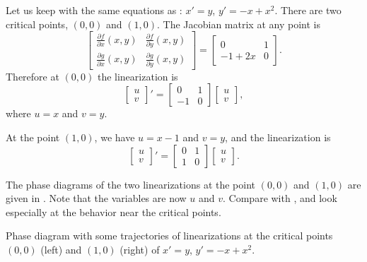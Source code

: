 \begin{example} \label{example:nlin-1b-examplelin}
Let us keep with the same equations as :
$x' = y$, $y' = -x+x^2$.  There are two critical points, $(0,0)$
and $(1,0)$.  The Jacobian matrix at any point is
\begin{equation*}
\begin{bmatrix}
\frac{\partial f}{\partial x}(x,y) &
\frac{\partial f}{\partial y}(x,y) \\
\frac{\partial g}{\partial x}(x,y) &
\frac{\partial g}{\partial y}(x,y)
\end{bmatrix} =
\begin{bmatrix}
0 & 1 \\
-1+2x & 0
\end{bmatrix}.
\end{equation*}
Therefore at $(0,0)$ the linearization is
\begin{equation*}
\begin{bmatrix} u \\ v \end{bmatrix} ' =
\begin{bmatrix}
0 & 1 \\
-1 & 0
\end{bmatrix}
\begin{bmatrix} u \\ v \end{bmatrix} ,
\end{equation*}
where $u=x$ and $v=y$.

At the point $(1,0)$, we have $u=x-1$ and $v=y$, and the linearization is
\begin{equation*}
\begin{bmatrix} u \\ v \end{bmatrix} ' =
\begin{bmatrix}
0 & 1 \\
1 & 0
\end{bmatrix}
\begin{bmatrix} u \\ v \end{bmatrix} .
\end{equation*}

The phase diagrams of the two linearizations at the
point $(0,0)$ and $(1,0)$ are given in .  Note
that the variables are now $u$ and $v$.  Compare
 with , and look especially at the
behavior near the critical points.

\begin{myfig}
\capstart
\caption{Phase diagram with some trajectories of
linearizations at the critical points $(0,0)$ (left) and $(1,0)$ (right) of
$x' = y$, $y' = -x+x^2$. \label{fig:nlin-1b-lin}}
\end{myfig}
\end{example}

